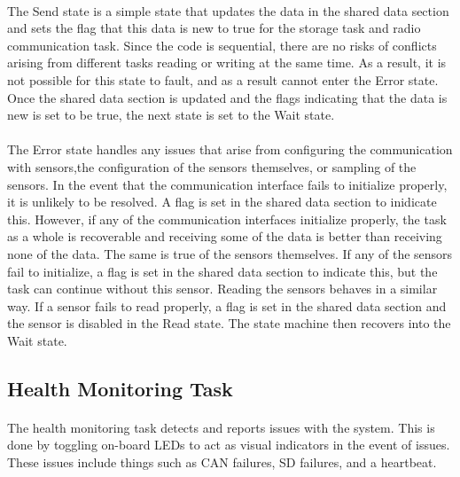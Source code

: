\paragraph{}
The Send state is a simple state that updates the data in the shared data section and sets the flag that this data is new to true for the storage task and radio communication task.
Since the code is sequential, there are no risks of conflicts arising from different tasks reading or writing at the same time.
As a result, it is not possible for this state to fault, and as a result cannot enter the Error state.
Once the shared data section is updated and the flags indicating that the data is new is set to be true, the next state is set to the Wait state.

\paragraph{}
The Error state handles any issues that arise from configuring the communication with sensors,the configuration of the sensors themselves, or sampling of the sensors.
In the event that the communication interface fails to initialize properly, it is unlikely to be resolved.
A flag is set in the shared data section to inidicate this.
However, if any of the communication interfaces initialize properly, the task as a whole is recoverable and receiving some of the data is better than receiving none of the data.
The same is true of the sensors themselves.
If any of the sensors fail to initialize, a flag is set in the shared data section to indicate this, but the task can continue without this sensor.
Reading the sensors behaves in a similar way.
If a sensor fails to read properly, a flag is set in the shared data section and the sensor is disabled in the Read state.
The state machine then recovers into the Wait state.

\subsection{Health Monitoring Task}

\paragraph{}
The health monitoring task detects and reports issues with the system.
This is done by toggling on-board LEDs to act as visual indicators in the event of issues.
These issues include things such as CAN failures, SD failures, and a heartbeat.

